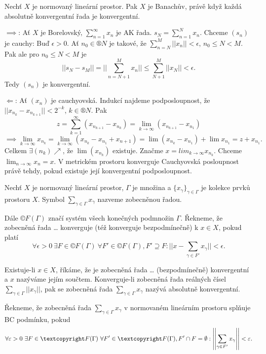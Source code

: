 \documentclass[12pt]{article}					%
\begin{document}
\begin{veta}
	Nechť $X$ je normovaný lineární prostor. Pak $X$ je Banachův, právě když každá absolutně konvergentní řada je konvergentní.

	\begin{dukazin}
		$\implies$: Ať $X$ je Borelovský, $\sum_{n=1}^∞ x_n$ je AK řada. $s_N = \sum_{n=1}^N x_n$. Chceme $(s_n)$ je cauchy: Buď $\epsilon > 0$. Ať $n_0 \in ®N$ je takové, že $\sum_{n=N}^M ||x_n|| < \epsilon$, $n_0 ≤ N < M$. Pak ale pro $n_0 ≤ N < M$ je
		$$ ||s_N - s_M|| = ||\sum_{n=N+1}^M x_n|| ≤ \sum_{N+1}^M||x_N|| < \epsilon. $$
		Tedy $(s_n)$ je konvergentní.

		$\Leftarrow$: Ať $(x_n)$ je cauchyovská. Indukcí najdeme podposloupnost, že $||x_{n_k} - x_{n_{k+1}}|| < 2^{-k}$, $k \in ®N$. Pak
		$$ z = \sum_{k=1}^∞(x_{n_{k+1}} - x_{n_k}) = \lim_{k \rightarrow ∞}(x_{n_{k+1}} - x_{n_1}) $$
		$$ \implies \lim_{k \rightarrow ∞} x_{n_k} = \lim_{k \rightarrow ∞} (x_{n_k} - x_{n_1} + x_{n+1}) = \lim(x_{n_k} - x_{n_1}) + \lim x_{n_1} = z + x_{n_1}. $$
		Celkem $\exists (n_k) \nearrow$, že $\lim(x_{n_k})$ existuje. Značme $x = lim_{k \rightarrow ∞} x_{n_k}$.
		Chceme $\lim_{n \rightarrow ∞} x_n = x$. V metrickém prostoru konverguje Cauchyovská posloupnost právě tehdy, pokud existuje její konvergentní podposloupnost.
	\end{dukazin}
\end{veta}

\begin{definice}
	Nechť $X$ je normovaný lineární prostor, $\Gamma$ je množina a $\{x_\gamma\}_{\gamma \in \Gamma}$ je kolekce prvků prostoru $X$. Symbol $\sum_{\gamma \in \Gamma} x_\gamma$ nazveme zobecněnou řadou.

	Dále $©F(\Gamma)$ značí systém všech konečných podmnožin $\Gamma$. Řekneme, že zobecněná řada … konverguje (též konverguje bezpodmínečně) k $x \in X$, pokud platí
	$$ \forall \epsilon > 0\ \exists F \in ©F(\Gamma)\ \forall F' \in ©F(\Gamma), F' \supseteq F: ||x - \sum_{\gamma \in F'} x_\gamma|| < \epsilon. $$

	Existuje-li $x \in X$, říkáme, že je zobecněná řada … (bezpodmínečně) konvergentní a $x$ nazýváme jejím součtem. Konverguje-li zobecněná řada reálných čísel $\sum_{\gamma \in \Gamma} ||x_\gamma||$, pak se zobecněná řada $\sum_{\gamma \in \Gamma} x_\gamma$ nazývá absolutně konvergentní.
\end{definice}

\begin{definice}
	Řekneme, že zobecněná řada $\sum_{\gamma \in \Gamma} x_\gamma$ v normovaném lineárním prostoru splňuje BC podmínku, pokud
	$$ \forall \epsilon > 0\ \exists F \in ©F(\Gamma)\ \forall F' \in ©F(\Gamma), F' \cap F = \O: \left|\left| \sum_{\gamma \in F'} x_\gamma \right|\right| < \epsilon. $$
\end{definice}
\end{document}
